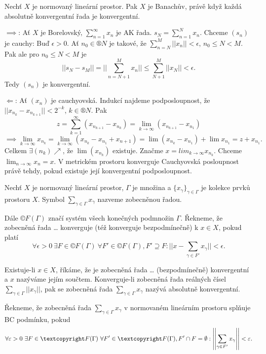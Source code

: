 \documentclass[12pt]{article}					%
\begin{document}
\begin{veta}
	Nechť $X$ je normovaný lineární prostor. Pak $X$ je Banachův, právě když každá absolutně konvergentní řada je konvergentní.

	\begin{dukazin}
		$\implies$: Ať $X$ je Borelovský, $\sum_{n=1}^∞ x_n$ je AK řada. $s_N = \sum_{n=1}^N x_n$. Chceme $(s_n)$ je cauchy: Buď $\epsilon > 0$. Ať $n_0 \in ®N$ je takové, že $\sum_{n=N}^M ||x_n|| < \epsilon$, $n_0 ≤ N < M$. Pak ale pro $n_0 ≤ N < M$ je
		$$ ||s_N - s_M|| = ||\sum_{n=N+1}^M x_n|| ≤ \sum_{N+1}^M||x_N|| < \epsilon. $$
		Tedy $(s_n)$ je konvergentní.

		$\Leftarrow$: Ať $(x_n)$ je cauchyovská. Indukcí najdeme podposloupnost, že $||x_{n_k} - x_{n_{k+1}}|| < 2^{-k}$, $k \in ®N$. Pak
		$$ z = \sum_{k=1}^∞(x_{n_{k+1}} - x_{n_k}) = \lim_{k \rightarrow ∞}(x_{n_{k+1}} - x_{n_1}) $$
		$$ \implies \lim_{k \rightarrow ∞} x_{n_k} = \lim_{k \rightarrow ∞} (x_{n_k} - x_{n_1} + x_{n+1}) = \lim(x_{n_k} - x_{n_1}) + \lim x_{n_1} = z + x_{n_1}. $$
		Celkem $\exists (n_k) \nearrow$, že $\lim(x_{n_k})$ existuje. Značme $x = lim_{k \rightarrow ∞} x_{n_k}$.
		Chceme $\lim_{n \rightarrow ∞} x_n = x$. V metrickém prostoru konverguje Cauchyovská posloupnost právě tehdy, pokud existuje její konvergentní podposloupnost.
	\end{dukazin}
\end{veta}

\begin{definice}
	Nechť $X$ je normovaný lineární prostor, $\Gamma$ je množina a $\{x_\gamma\}_{\gamma \in \Gamma}$ je kolekce prvků prostoru $X$. Symbol $\sum_{\gamma \in \Gamma} x_\gamma$ nazveme zobecněnou řadou.

	Dále $©F(\Gamma)$ značí systém všech konečných podmnožin $\Gamma$. Řekneme, že zobecněná řada … konverguje (též konverguje bezpodmínečně) k $x \in X$, pokud platí
	$$ \forall \epsilon > 0\ \exists F \in ©F(\Gamma)\ \forall F' \in ©F(\Gamma), F' \supseteq F: ||x - \sum_{\gamma \in F'} x_\gamma|| < \epsilon. $$

	Existuje-li $x \in X$, říkáme, že je zobecněná řada … (bezpodmínečně) konvergentní a $x$ nazýváme jejím součtem. Konverguje-li zobecněná řada reálných čísel $\sum_{\gamma \in \Gamma} ||x_\gamma||$, pak se zobecněná řada $\sum_{\gamma \in \Gamma} x_\gamma$ nazývá absolutně konvergentní.
\end{definice}

\begin{definice}
	Řekneme, že zobecněná řada $\sum_{\gamma \in \Gamma} x_\gamma$ v normovaném lineárním prostoru splňuje BC podmínku, pokud
	$$ \forall \epsilon > 0\ \exists F \in ©F(\Gamma)\ \forall F' \in ©F(\Gamma), F' \cap F = \O: \left|\left| \sum_{\gamma \in F'} x_\gamma \right|\right| < \epsilon. $$
\end{definice}
\end{document}
